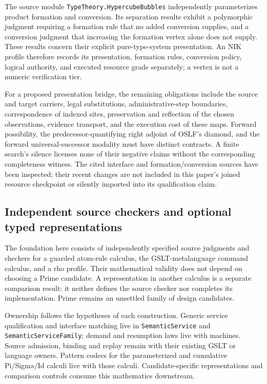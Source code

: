 \documentclass[11pt]{article}
\newcommand{\code}[1]{\nolinkurl{#1}}
\begin{document}
The source module \code{TypeTheory.HypercubeBubbles} independently
parameterizes product formation and conversion. Its separation results
exhibit a polymorphic judgment requiring a formation rule that no added
conversion supplies, and a conversion judgment that increasing the
formation vertex alone does not supply. These results concern their
explicit pure-type-system presentation. An NIK profile therefore records
its presentation, formation rules, conversion policy, logical authority,
and executed resource grade separately; a vertex is not a numeric
verification tier.

For a proposed presentation bridge, the remaining obligations include
the source and target carriers, legal substitutions, administrative-step
boundaries, correspondence of indexed sites, preservation and reflection
of the chosen observations, evidence transport, and the execution cost
of these maps. Forward possibility, the predecessor-quantifying right
adjoint of OSLF's diamond, and the forward universal-successor modality
must have distinct contracts. A finite search's silence licenses none
of their negative claims without the corresponding completeness witness.
The cited interface and formation/conversion sources have been inspected;
their recent changes are not included in this paper's joined resource
checkpoint or silently imported into its qualification claim.

\subsection{Independent source checkers and optional typed representations}
The foundation here consists of independently specified source judgments and
checkers for a guarded atom-rule calculus, the GSLT-metalanguage command
calculus, and a rho profile.
Their mathematical validity does not depend on choosing a Prime candidate.
A representation in another calculus is a separate comparison result:
it neither defines the source checker nor completes its implementation.
Prime remains an unsettled family of design candidates.

Ownership follows the hypotheses of each construction. Generic service
qualification and interface matching live in \code{SemanticService} and
\code{SemanticServiceFamily}; demand and resumption laws live with machines.
Source admission, binding and replay remain with their existing GSLT or
language owners. Pattern codecs for the parameterized and cumulative
Pi/Sigma/Id calculi live with those calculi. Candidate-specific representations
and comparison controls consume this mathematics downstream.
\end{document}

